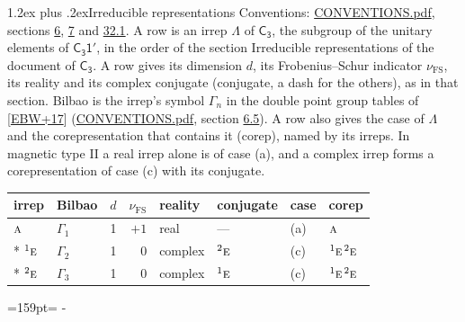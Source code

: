 \documentclass[10pt,a4paper]{article}
\makeatletter
\renewcommand\section{\@startsection{section}{1}{\z@}{-3ex plus -1ex minus -.2ex}%
  {1.2ex plus .2ex}{\normalfont\large\sffamily\bfseries\color{parttitle}}}
\newcommand{\needspace}[1]{\par\penalty-100\begingroup\dimen0=#1\relax\dimen2=\pagegoal
  \advance\dimen2-\pagetotal\ifdim\dimen0>\dimen2\relax\ifdim\dimen2>0pt\vfil\break\fi\fi
  \endgroup}
\numberwithin{equation}{section}
\newcommand{\grp}[1]{\mathsf{#1}}
\newcommand{\irr}[1]{\text{\normalfont\scshape #1}}
\newcommand{\conjpair}[1]{{}^{#1}}
\newcommand{\fsind}{\nu_{\mathrm{FS}}}
\makeatother
\begin{document}
\section{Irreducible representations}\label{s:irreps}
Conventions: \href{../../CONVENTIONS.pdf}{CONVENTIONS.pdf}, sections \href{../../../rotation/CONVENTIONS.pdf\#conv.6}{6}, \href{../../../rotation/CONVENTIONS.pdf\#conv.7}{7} and \href{../../CONVENTIONS.pdf\#conv.32.1}{32.1}.
\leavevmode\label{n:irrep.Delta}A row is an irrep $\Lambda$ of $\grp{C_{3}}$, the subgroup of the unitary elements of $\grp{C_{3}1'}$, in the order of the section Irreducible representations of the document of \href{../../../rotation/data/pdf/C3.pdf}{$\grp{C_{3}}$}. \label{n:index.dimension}\label{n:index.frobenius}\label{n:head.irrep}\label{n:head.reality}\label{n:head.conjugate}A row gives its dimension $d$, its Frobenius--Schur indicator $\fsind$, its reality and its complex conjugate (conjugate, a dash for the others), as in that section. \label{n:head.bilbao}\label{n:irrep.alias.gamma}Bilbao is the irrep's symbol $\Gamma_n$ in the double point group tables of [\href{../../../REFERENCES.pdf\#ref.EBW+17}{EBW+17}] (\href{../../CONVENTIONS.pdf}{CONVENTIONS.pdf}, section \href{../../../rotation/CONVENTIONS.pdf\#conv.6.5}{6.5}). \label{n:head.case.corep}\label{n:head.corep}A row also gives the case of $\Lambda$ and the corepresentation that contains it (corep), named by its irreps. In magnetic type II a real irrep alone is of case (a), and a complex irrep forms a corepresentation of case (c) with its conjugate.
\setlength{\emergencystretch}{2em}\par\setlength{\emergencystretch}{0pt}
{\small\renewcommand{\arraystretch}{1.25}\setlength{\tabcolsep}{4pt}\begin{longtable}{@{}llrrllll@{}}\toprule
irrep & Bilbao & $d$ & $\fsind$ & reality & conjugate & case & corep\\\midrule\endhead
\bottomrule\endfoot\endlastfoot
$\irr{a}$ & $\Gamma_{1}$ & 1 & $+1$ & real & --- & (a) & $\irr{a}$\\*
$\conjpair{1}\irr{e}$ & $\Gamma_{2}$ & 1 & $0$ & complex & $\conjpair{2}\irr{e}$ & (c) & $\conjpair{1}\irr{e}\,\conjpair{2}\irr{e}$\\*
$\conjpair{2}\irr{e}$ & $\Gamma_{3}$ & 1 & $0$ & complex & $\conjpair{1}\irr{e}$ & (c) & $\conjpair{1}\irr{e}\,\conjpair{2}\irr{e}$\\
\bottomrule\end{longtable}}
\needspace{159pt}
\end{document}
